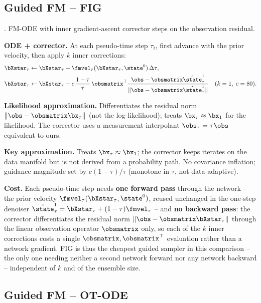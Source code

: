 \subsection{Guided FM -- FIG}\label{appendix:method:fig}

\cite{yan_fig_2025}. FM-ODE with inner gradient-ascent corrector steps on the observation residual.

\textbf{ODE + corrector.}
At each pseudo-time step $\tau_i$, first advance with the prior velocity, then apply $k$ inner corrections:
\begin{align}
  \bXstar_\tau &\leftarrow \bXstar_\tau + \fmvel_\tau(\bXstar_\tau,\state^0)\,\Delta\tau, \\
  \bXstar_\tau &\leftarrow \bXstar_\tau
    + c\,\frac{1-\tau}{\tau}\,\obsmatrix^\top
      \frac{\obs - \obsmatrix\hat{\state}^1_\tau}{\|\obs - \obsmatrix\hat{\state}^1_\tau\|}
  \quad (k=1,\; c=80).
\end{align}

\textbf{Likelihood approximation.}
Differentiates the residual norm $\|\obs-\obsmatrix\bx_\tau\|$ (not the log-likelihood); treats $\bx_\tau\approx\bx_1$ for the likelihood.
The corrector uses a measurement interpolant $\obs_\tau=\tau\obs$ equivalent to ours.

\textbf{Key approximation.}
Treats $\bx_\tau\approx\bx_1$; the corrector keeps iterates on the data manifold but is not derived from a probability path.
No covariance inflation; guidance magnitude set by $c(1-\tau)/\tau$ (monotone in $\tau$, not data-adaptive).

\textbf{Cost.}
Each pseudo-time step needs \textbf{one forward pass} through the network -- the prior velocity $\fmvel_\tau(\bXstar_\tau,\state^0)$, reused unchanged in the one-step denoiser $\hat{\state}^1_\tau=\bXstar_\tau+(1-\tau)\fmvel_\tau$ -- and \textbf{no backward pass}: the corrector differentiates the residual norm $\|\obs-\obsmatrix\bXstar_\tau\|$ through the linear observation operator $\obsmatrix$ only, so each of the $k$ inner corrections costs a single $\obsmatrix,\obsmatrix^\top$ evaluation rather than a network gradient. FIG is thus the cheapest guided sampler in this comparison -- the only one needing neither a second network forward nor any network backward -- independent of $k$ and of the ensemble size.

\subsection{Guided FM -- OT-ODE}\label{appendix:method:ot_ode}

